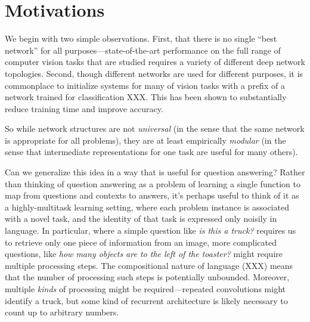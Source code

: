 \section{Motivations}

%
We begin with two simple observations. First, that there is no single ``best
network'' for all purposes---state-of-the-art performance on the full range of
computer vision tasks that are studied requires a variety of different deep
network topologies. Second, though different networks are used for different
purposes, it is commonplace to initialize systems for many of vision tasks with
a prefix of a network trained for classification \cite{Long14FullyConvolutional} XXX. 
This has been shown to substantially reduce training time and improve accuracy. 

So while network structures are not \emph{universal} (in the sense that the same
network is appropriate for all problems), they are at least empirically
\emph{modular} (in the sense that intermediate representations for one task are
useful for many others). 

Can we generalize this idea in a way that is useful for question answering?
Rather than thinking of question answering as a problem of learning a single
function to map from questions and contexts to answers, it's perhaps useful to
think of it as a highly-multitask learning setting, where each problem instance
is associated with a novel task, and the identity of that task is expressed only
noisily in language. In particular, where a simple question like \emph{is this a
truck?} requires us to retrieve only one piece of information from an image,
more complicated questions, like \emph{how many objects are to the left of
the toaster?} might require multiple processing steps. The compositional nature
of language (XXX) means that the number of processing such steps is potentially
unbounded. Moreover, multiple \emph{kinds} of processing might be
required---repeated convolutions might identify a truck, but some kind of
recurrent architecture is likely necessary to count up to arbitrary numbers.

